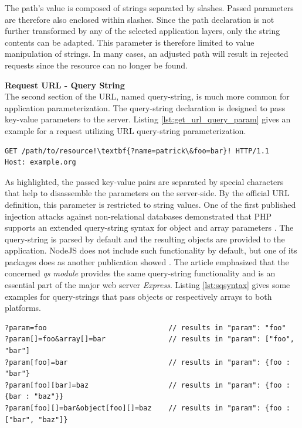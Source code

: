 The path's value is composed of strings separated by slashes. Passed parameters are therefore also enclosed within slashes. Since the path declaration is not further transformed by any of the selected application layers, only the string contents can be adapted. This parameter is therefore limited to value manipulation of strings. In many cases, an adjusted path will result in rejected requests since the resource can no longer be found.

\textbf{Request URL - Query String}\\
The second section of the URL, named query-string, is much more common for application parameterization. The query-string declaration is designed to pass key-value parameters to the server. Listing \ref{lst:get_url_query_param} gives an example for a request utilizing URL query-string parameterization. \\

\begin{lstlisting}[escapechar=!, caption={Example for GET request with URL query parameterization}, label={lst:get_url_query_param}]
GET /path/to/resource!\textbf{?name=patrick\&foo=bar}! HTTP/1.1
Host: example.org
\end{lstlisting}

As highlighted, the passed key-value pairs are separated by special characters that help to disassemble the parameters on the server-side. By the official URL definition, this parameter is restricted to string values. One of the first published injection attacks against non-relational databases demonstrated that PHP supports an extended query-string syntax for object and array parameters \cite{Sullivan:2011}. The query-string is parsed by default and the resulting objects are provided to the application. NodeJS does not include such functionality by default, but one of its packages does as another publication showed \cite{Petkov:2014a}. The article emphasized that the concerned \textit{qs module} provides the same query-string functionality and is an essential part of the major web server \textit{Express}. Listing \ref{lst:sqsyntax} gives some examples for query-strings that pass objects or respectively arrays to both platforms. \\

\begin{lstlisting}[caption={Examples for extended query-string syntax}, label={lst:sqsyntax}]
?param=foo                             // results in "param": "foo"
?param[]=foo&array[]=bar               // results in "param": ["foo", "bar"]
?param[foo]=bar                        // results in "param": {foo : "bar"}
?param[foo][bar]=baz                   // results in "param": {foo : {bar : "baz"}}
?param[foo][]=bar&object[foo][]=baz    // results in "param": {foo : ["bar", "baz"]}
\end{lstlisting}

